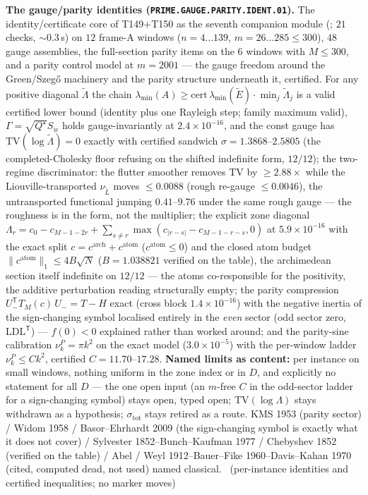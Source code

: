 \documentclass[11pt,a4paper]{article}
\theoremstyle{definition}
\begin{document}
\par\smallskip\noindent\textbf{The gauge/parity identities
(\texttt{PRIME.GAUGE.PARITY.IDENT.01}).}
The identity/certificate core of T149+T150 as the seventh companion module
(; $21$ checks, ${\sim}0.3$\,s) on
$12$ frame-A windows ($n=4\ldots139$, $m=26\ldots285\le300$), $48$ gauge
assemblies, the full-section parity items on the $6$ windows with $M\le300$,
and a parity control model at $m=2001$ --- the gauge freedom around the
Green/Szeg\H{o} machinery and the parity structure underneath it, certified.
For any positive diagonal $\tilde\Lambda$ the chain
$\lambda_{\min}(A)\ge\mathrm{cert}\,\lambda_{\min}(\tilde E)\cdot
\min_j\tilde\Lambda_j$ is a valid certified lower bound (identity plus one
Rayleigh step; family maximum valid), $\Gamma=\sqrt{Q^\star}S_w$ holds
gauge-invariantly at $2.4\times10^{-16}$, and the const gauge has
$\mathrm{TV}(\log\tilde\Lambda)=0$ exactly with certified sandwich
$\sigma=1.3868$--$2.5805$ (the completed-Cholesky floor refusing on the
shifted indefinite form, $12/12$); the two-regime discriminator: the flutter
smoother removes $\mathrm{TV}$ by $\ge2.88\times$ while the
Liouville-transported $\nu_{\tilde L}$ moves $\le0.0088$ (rough re-gauge
$\le0.0046$), the untransported functional jumping $0.41$--$9.76$ under the
same rough gauge --- the roughness is in the form, not the multiplier; the
explicit zone diagonal
$\Lambda_r=c_0-c_{M-1-2r}+\sum_{s\ne r}\max(c_{|r-s|}-c_{M-1-r-s},0)$ at
$5.9\times10^{-16}$ with the exact split
$c=c^{\mathrm{arch}}+c^{\mathrm{atom}}$ ($c^{\mathrm{atom}}\le0$) and the
closed atom budget $\|c^{\mathrm{atom}}\|_1\le4B\sqrt N$ ($B=1.038821$
verified on the table), the archimedean section itself indefinite on
$12/12$ --- the atoms co-responsible for the positivity, the additive
perturbation reading structurally empty; the parity compression
$U_-^{\mathsf T}T_M(c)\,U_-=T-H$ exact (cross block $1.4\times10^{-16}$)
with the negative inertia of the sign-changing symbol localised entirely in
the \emph{even} sector (odd sector zero, LDL$^{\mathsf T}$) --- $f(0)<0$
explained rather than worked around; and the parity-sine calibration
$\nu^P_k=\pi k^2$ on the exact model ($3.0\times10^{-5}$) with the
per-window ladder $\nu^P_k\le Ck^2$, certified $C=11.70$--$17.28$.
\textbf{Named limits as content:} per instance on small windows, nothing
uniform in the zone index or in $D$, and explicitly no statement for all $D$
--- the one open input (an $m$-free $C$ in the odd-sector ladder for a
sign-changing symbol) stays open, typed open; $\mathrm{TV}(\log\Lambda)$
stays withdrawn as a hypothesis; $\sigma_{\mathrm{tot}}$ stays retired as a
route. KMS 1953 (parity sector) / Widom 1958 / Basor--Ehrhardt 2009 (the
sign-changing symbol is exactly what it does not cover) / Sylvester
1852--Bunch--Kaufman 1977 / Chebyshev 1852 (verified on the table) / Abel /
Weyl 1912--Bauer--Fike 1960--Davis--Kahan 1970 (cited, computed dead, not
used) named classical.
\mE\ (per-instance identities and certified inequalities; no marker moves)
\par\smallskip
\end{document}
